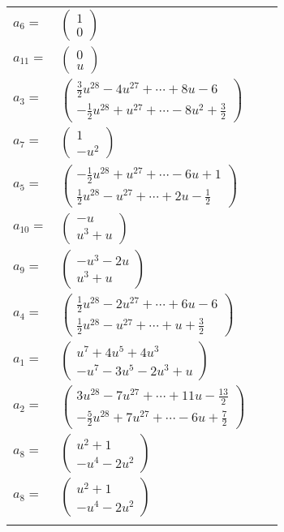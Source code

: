 \documentclass[1p]{elsarticle_modified}
\theoremstyle{definition}
\begin{document}
\begin{tabular}{m{7pt} m{180pt} m{7pt} m{180pt} }
\flushright $a_{6}=$&$\begin{pmatrix}1\\0\end{pmatrix}$ \\
\flushright $a_{11}=$&$\begin{pmatrix}0\\u\end{pmatrix}$ \\
\flushright $a_{3}=$&$\begin{pmatrix}\frac{3}{2} u^{28}-4 u^{27}+\cdots+8 u-6\\-\frac{1}{2} u^{28}+u^{27}+\cdots-8 u^2+\frac{3}{2}\end{pmatrix}$ \\
\flushright $a_{7}=$&$\begin{pmatrix}1\\- u^2\end{pmatrix}$ \\
\flushright $a_{5}=$&$\begin{pmatrix}-\frac{1}{2} u^{28}+u^{27}+\cdots-6 u+1\\\frac{1}{2} u^{28}- u^{27}+\cdots+2 u-\frac{1}{2}\end{pmatrix}$ \\
\flushright $a_{10}=$&$\begin{pmatrix}- u\\u^3+u\end{pmatrix}$ \\
\flushright $a_{9}=$&$\begin{pmatrix}- u^3-2 u\\u^3+u\end{pmatrix}$ \\
\flushright $a_{4}=$&$\begin{pmatrix}\frac{1}{2} u^{28}-2 u^{27}+\cdots+6 u-6\\\frac{1}{2} u^{28}- u^{27}+\cdots+u+\frac{3}{2}\end{pmatrix}$ \\
\flushright $a_{1}=$&$\begin{pmatrix}u^7+4 u^5+4 u^3\\- u^7-3 u^5-2 u^3+u\end{pmatrix}$ \\
\flushright $a_{2}=$&$\begin{pmatrix}3 u^{28}-7 u^{27}+\cdots+11 u-\frac{13}{2}\\-\frac{5}{2} u^{28}+7 u^{27}+\cdots-6 u+\frac{7}{2}\end{pmatrix}$ \\
\flushright $a_{8}=$&$\begin{pmatrix}u^2+1\\- u^4-2 u^2\end{pmatrix}$\\ \flushright $a_{8}=$&$\begin{pmatrix}u^2+1\\- u^4-2 u^2\end{pmatrix}$\\&\end{tabular}
\end{document}
